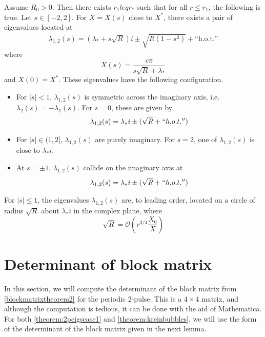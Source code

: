 \documentclass[thesis.tex]{subfiles}
\begin{document}
\begin{theorem}
Assume $R_0 > 0$. Then there exists $r_1 
leq r_*$ such that for all $r \leq r_1$, the following is true. Let $s \in [-2, 2]$. For $X = X(s)$ close to $X^*$, there exists a pair of eigenvalues located at
\begin{align*}
\lambda_{1,2}(s) = \left( \lambda_* + s \sqrt{R} \right) i \pm \sqrt{R(1 - s^2)} + \text{``h.o.t.''}
\end{align*}
where
\[
X(s) = \frac{c \pi}{s \sqrt{R} + \lambda_*}
\]
and $X(0) = X^*$. These eigenvalues have the following configuration.
\begin{itemize}
\item For $|s| < 1$, $\lambda_{1,2}(s)$ is symmetric across the imaginary axis, i.e. $\lambda_2(s) = -\overline{\lambda_1}(s)$. For $s = 0$, these are given by
\[
\lambda_{1,2}(s) = \lambda_* i \pm (\sqrt{R} + ``h.o.t.'')
\]
\item For $|s| \in (1, 2]$, $\lambda_{1,2}(s)$
are purely imaginary. For $s = 2$, one of $\lambda_{1,2}(s)$ is close to $\lambda_* i$.
\item At $s = \pm 1$, $\lambda_{1,2}(s)$ collide on the imaginary axis at 
\[
\lambda_{1,2}(s) = \lambda_* i \pm (\sqrt{R} + ``h.o.t.'')
\]
\end{itemize}
For $|s| \leq 1$, the eigenvalues $\lambda_{1,2}(s)$ are, to leading order, located on a circle of radius $\sqrt{R}$ about $\lambda_* i$ in the complex plane, where
\[
\sqrt{R} = \mathcal{O}\left( r^{3/4}\frac{X_0}{X} \right)
\]
\end{theorem}

\section{Determinant of block matrix}\label{sec:blockdet}

In this section, we will compute the determinant of the block matrix from \cref{blockmatrixtheorem2} for the periodic 2-pulse. This is a $4 \times 4$ matrix, and although the computation is tedious, it can be done with the aid of Mathematica. For both \cref{theorem:2peigscase1} and \cref{theorem:kreinbubbles}, we will use the form of the determinant of the block matrix given in the next lemma.
\end{document}
